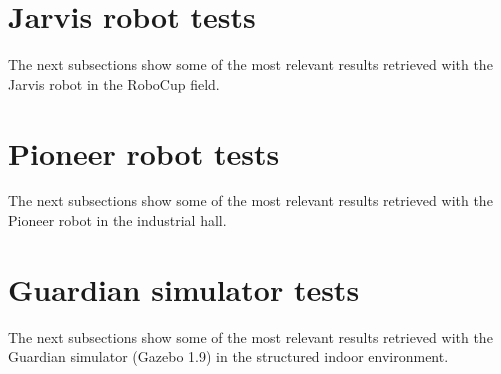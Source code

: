 \clearpage
\section{Jarvis robot tests}

The next subsections show some of the most relevant results retrieved with the Jarvis robot in the RoboCup field.









\clearpage
\section{Pioneer robot tests}

The next subsections show some of the most relevant results retrieved with the Pioneer robot in the industrial hall.







\clearpage
\section{Guardian simulator tests}

The next subsections show some of the most relevant results retrieved with the Guardian simulator (Gazebo 1.9) in the structured indoor environment.




